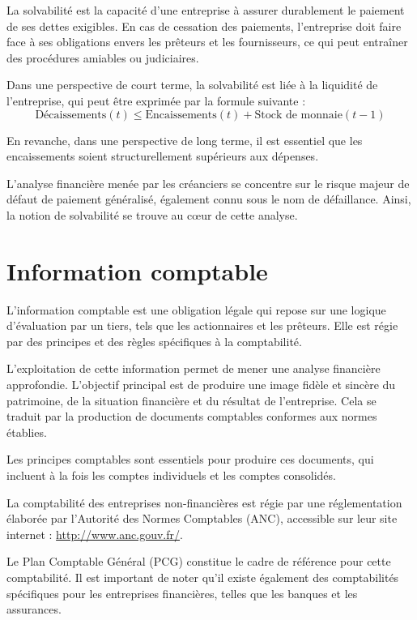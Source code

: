 \documentclass[a4paper, 12pt]{report}
\begin{document}
La solvabilité est la capacité d'une entreprise à assurer durablement le paiement de ses dettes exigibles. En cas de cessation des paiements, l'entreprise doit faire face à ses obligations envers les prêteurs et les fournisseurs, ce qui peut entraîner des procédures amiables ou judiciaires.

Dans une perspective de court terme, la solvabilité est liée à la liquidité de l'entreprise, qui peut être exprimée par la formule suivante :
\[
\text{Décaissements}(t) \leq \text{Encaissements}(t) + \text{Stock de monnaie}(t-1)
\]

En revanche, dans une perspective de long terme, il est essentiel que les encaissements soient structurellement supérieurs aux dépenses.

L'analyse financière menée par les créanciers se concentre sur le risque majeur de défaut de paiement généralisé, également connu sous le nom de défaillance. Ainsi, la notion de solvabilité se trouve au cœur de cette analyse.

\section{Information comptable}

L'information comptable est une obligation légale qui repose sur une logique d'évaluation par un tiers, tels que les actionnaires et les prêteurs. Elle est régie par des principes et des règles spécifiques à la comptabilité.

L'exploitation de cette information permet de mener une analyse financière approfondie. L'objectif principal est de produire une image fidèle et sincère du patrimoine, de la situation financière et du résultat de l'entreprise. Cela se traduit par la production de documents comptables conformes aux normes établies.

Les principes comptables sont essentiels pour produire ces documents, qui incluent à la fois les comptes individuels et les comptes consolidés.

La comptabilité des entreprises non-financières est régie par une réglementation élaborée par l'Autorité des Normes Comptables (ANC), accessible sur leur site internet : \url{http://www.anc.gouv.fr/}. 

Le Plan Comptable Général (PCG) constitue le cadre de référence pour cette comptabilité. Il est important de noter qu'il existe également des comptabilités spécifiques pour les entreprises financières, telles que les banques et les assurances.
\end{document}
